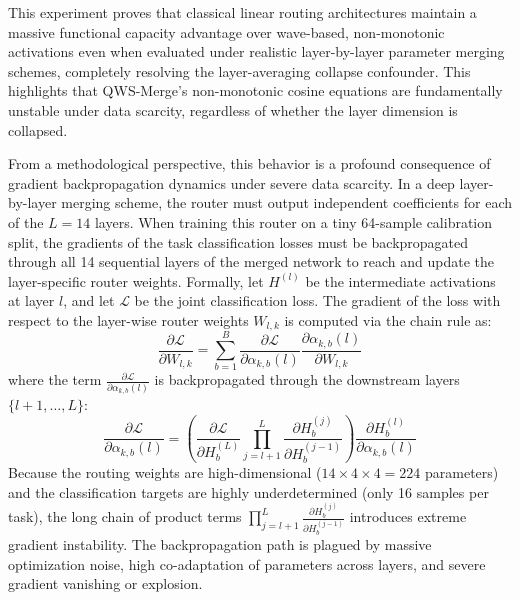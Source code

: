 This experiment proves that classical linear routing architectures maintain a massive functional capacity advantage over wave-based, non-monotonic activations even when evaluated under realistic layer-by-layer parameter merging schemes, completely resolving the layer-averaging collapse confounder. This highlights that QWS-Merge's non-monotonic cosine equations are fundamentally unstable under data scarcity, regardless of whether the layer dimension is collapsed.

From a methodological perspective, this behavior is a profound consequence of gradient backpropagation dynamics under severe data scarcity. In a deep layer-by-layer merging scheme, the router must output independent coefficients for each of the $L=14$ layers. When training this router on a tiny 64-sample calibration split, the gradients of the task classification losses must be backpropagated through all 14 sequential layers of the merged network to reach and update the layer-specific router weights. Formally, let $H^{(l)}$ be the intermediate activations at layer $l$, and let $\mathcal{L}$ be the joint classification loss. The gradient of the loss with respect to the layer-wise router weights $W_{l, k}$ is computed via the chain rule as:
\begin{equation}
    \frac{\partial \mathcal{L}}{\partial W_{l, k}} = \sum_{b=1}^B \frac{\partial \mathcal{L}}{\partial \alpha_{k, b}(l)} \frac{\partial \alpha_{k, b}(l)}{\partial W_{l, k}}
\end{equation}
where the term $\frac{\partial \mathcal{L}}{\partial \alpha_{k, b}(l)}$ is backpropagated through the downstream layers $\{l+1, \dots, L\}$:
\begin{equation}
    \frac{\partial \mathcal{L}}{\partial \alpha_{k, b}(l)} = \left( \frac{\partial \mathcal{L}}{\partial H^{(L)}_b} \prod_{j=l+1}^L \frac{\partial H^{(j)}_b}{\partial H^{(j-1)}_b} \right) \frac{\partial H^{(l)}_b}{\partial \alpha_{k, b}(l)}
\end{equation}
Because the routing weights are high-dimensional ($14 \times 4 \times 4 = 224$ parameters) and the classification targets are highly underdetermined (only 16 samples per task), the long chain of product terms $\prod_{j=l+1}^L \frac{\partial H^{(j)}_b}{\partial H^{(j-1)}_b}$ introduces extreme gradient instability. The backpropagation path is plagued by massive optimization noise, high co-adaptation of parameters across layers, and severe gradient vanishing or explosion.

